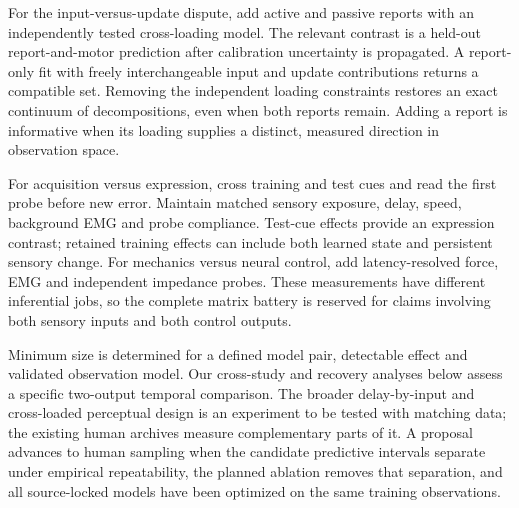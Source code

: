 \documentclass[11pt,a4paper]{article}
\begin{document}
For the input-versus-update dispute, add active and passive reports with an independently tested cross-loading model. The relevant contrast is a held-out report-and-motor prediction after calibration uncertainty is propagated. A report-only fit with freely interchangeable input and update contributions returns a compatible set. Removing the independent loading constraints restores an exact continuum of decompositions, even when both reports remain. Adding a report is informative when its loading supplies a distinct, measured direction in observation space.

For acquisition versus expression, cross training and test cues and read the first probe before new error. Maintain matched sensory exposure, delay, speed, background EMG and probe compliance. Test-cue effects provide an expression contrast; retained training effects can include both learned state and persistent sensory change. For mechanics versus neural control, add latency-resolved force, EMG and independent impedance probes. These measurements have different inferential jobs, so the complete matrix battery is reserved for claims involving both sensory inputs and both control outputs. \cite{coin2021,franklin2003,unlearning2016}

Minimum size is determined for a defined model pair, detectable effect and validated observation model. Our cross-study and recovery analyses below assess a specific two-output temporal comparison. The broader delay-by-input and cross-loaded perceptual design is an experiment to be tested with matching data; the existing human archives measure complementary parts of it. A proposal advances to human sampling when the candidate predictive intervals separate under empirical repeatability, the planned ablation removes that separation, and all source-locked models have been optimized on the same training observations.
\end{document}
